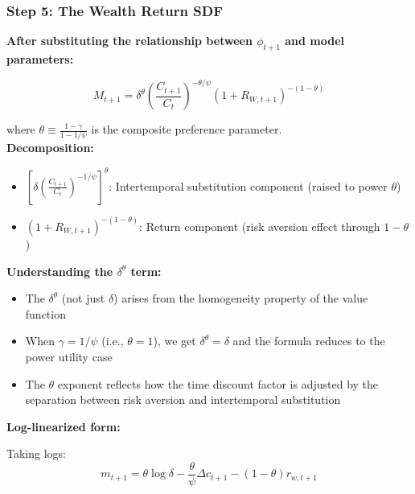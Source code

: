 \documentclass{beamer}
\begin{document}
\begin{frame}[allowframebreaks]
    \frametitle{Step 5: The Wealth Return SDF}
    
    \textbf{After substituting the relationship between $\phi_{t+1}$ and model parameters:}
    
    \begin{tcolorbox}[colback=blue!5!white, colframe=blue!75!black, title=Wealth Return Form of Epstein-Zin SDF]
    \begin{equation*}
        M_{t+1} = \delta^{\theta} \left( \frac{C_{t+1}}{C_t} \right)^{-\theta/\psi} (1 + R_{W,t+1})^{-(1-\theta)}
    \end{equation*}
    \end{tcolorbox}
    
    where $\theta \equiv \frac{1-\gamma}{1-1/\psi}$ is the composite preference parameter. \\

    \textbf{Decomposition:}
    \begin{itemize}
        \item $\left[\delta \left( \frac{C_{t+1}}{C_t} \right)^{-1/\psi}\right]^{\theta}$: Intertemporal substitution component (raised to power $\theta$)
        \item $(1 + R_{W,t+1})^{-(1-\theta)}$: Return component (risk aversion effect through $1-\theta$)
    \end{itemize}
    
    \framebreak
    
    \textbf{Understanding the $\delta^{\theta}$ term:}
    
    \begin{itemize}
        \item The $\delta^{\theta}$ (not just $\delta$) arises from the homogeneity property of the value function
        \item When $\gamma = 1/\psi$ (i.e., $\theta = 1$), we get $\delta^{\theta} = \delta$ and the formula reduces to the power utility case
        \item The $\theta$ exponent reflects how the time discount factor is adjusted by the separation between risk aversion and intertemporal substitution
    \end{itemize}
    
    
    \framebreak
    
    \textbf{Log-linearized form:}
    
    Taking logs:
    \begin{equation*}
        m_{t+1} = \theta \log \delta - \frac{\theta}{\psi} \Delta c_{t+1} - (1-\theta) r_{w,t+1}
    \end{equation*}
    

\end{frame}
\end{document}
